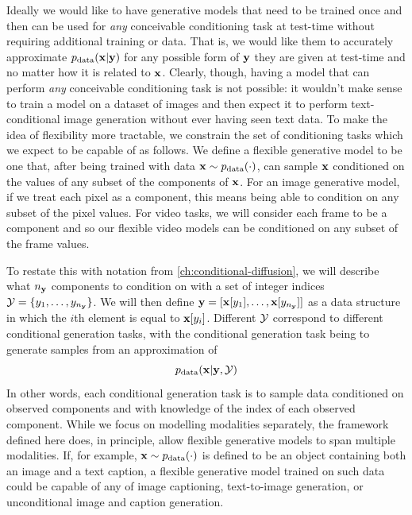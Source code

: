 Ideally we would like to have generative models that need to be trained once and then can be used for \textit{any} conceivable conditioning task at test-time without requiring additional training or data. That is, we would like them to accurately approximate $p_{\rm{data}}({\mathbf{x}}|{\mathbf{y}})$ for any possible form of ${\mathbf{y}}$ they are given at test-time and no matter how it is related to ${\mathbf{x}}$. Clearly, though, having a model that can perform \textit{any} conceivable conditioning task is not possible: it wouldn't make sense to train a model on a dataset of images and then expect it to perform text-conditional image generation without ever having seen text data. 
%
To make the idea of flexibility more tractable, we constrain the set of conditioning tasks which we expect to be capable of as follows. We define a flexible generative model to be one that, after being trained with data ${\mathbf{x}} \sim p_{\rm{data}}(\cdot)$, can sample ${\mathbf{x}}$ conditioned on the values of any subset of the components of ${\mathbf{x}}$. For an image generative model, if we treat each pixel as a component, this means being able to condition on any subset of the pixel values. For video tasks, we will consider each frame to be a component and so our flexible video models can be conditioned on any subset of the frame values.

To restate this with notation from \cref{ch:conditional-diffusion}, we will describe what $n_{\mathbf{y}}$ components to condition on with a set of integer indices ${\mathcal{Y}} = \{ y_1, \ldots, y_{n_{\mathbf{y}}} \}$. We will then define ${\mathbf{y}} = [ {\mathbf{x}}[y_1], \ldots, {\mathbf{x}}[y_{n_{\mathbf{y}}}] ]$ as a data structure in which the $i$th element is equal to ${\mathbf{x}}[y_i]$. Different ${\mathcal{Y}}$ correspond to different conditional generation tasks, with the conditional generation task being to generate samples from an approximation of
\begin{equation} \label{eq:flexible-diffusion-target}
    p_{\rm{data}}({\mathbf{x}} | {\mathbf{y}}, {\mathcal{Y}})
\end{equation}
In other words, each conditional generation task is to sample data conditioned on observed components and with knowledge of the index of each observed component. 
%
While we focus on modelling modalities separately, the framework defined here does, in principle, allow flexible generative models to span multiple modalities. If, for example, ${\mathbf{x}} \sim p_{\rm{data}}(\cdot)$ is defined to be an object containing both an image and a text caption, a flexible generative model trained on such data could be capable of any of image captioning, text-to-image generation, or unconditional image and caption generation.

